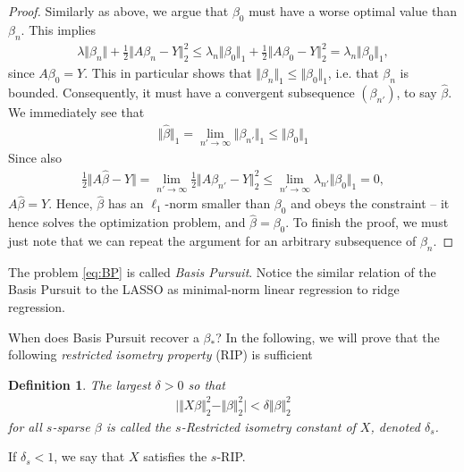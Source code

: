 \documentclass{article}
\newtheorem{defi}{Definition}
\newcommand{\abs}[1]{\vert #1 \vert}
\newcommand{\norm}[1]{\Vert #1 \Vert}
\begin{document}
\begin{proof}
    Similarly as above, we argue that $\beta_0$ must have a worse optimal value than $\beta_n$. This implies
    \begin{align*}
        \lambda \norm{\beta_n} + \tfrac{1}{2}\norm{A\beta_n- Y}_2^2 \leq \lambda_n \norm{\beta_0}_1 +\tfrac{1}{2}\norm{A\beta_0- Y}_2^2 = \lambda_n\norm{\beta_0}_1,
    \end{align*}
    since $A\beta_0 = Y$. This in particular shows that $\norm{\beta_n}_1 \leq \norm{\beta_0}_1$, i.e. that $\beta_n$ is bounded. Consequently, it must have a convergent subsequence $(\beta_{n'})$, to say $\hat{\beta}$. We immediately see that 
    \begin{align*}
        \norm{\hat{\beta}}_1 = \lim_{n'\to \infty }\norm{\beta_{n'}}_1 \leq \norm{\beta_0}_1
    \end{align*}
    Since also
    \begin{align*}
        \tfrac{1}{2}\norm{A\hat{\beta}-Y} = \lim_{n'\to \infty} \tfrac{1}{2}\norm{A\beta_{n'}- Y}_2^2 \leq \lim_{n'\to\infty}\lambda_{n'} \norm{\beta_0}_1 = 0,
    \end{align*}
    $A\hat{\beta}=Y$. Hence, $\hat{\beta}$ has an $\ell_1$-norm smaller than $\beta_0$ and obeys the constraint -- it hence solves the optimization problem, and $\hat{\beta}=\beta_0$. To finish the proof, we must just note that we can repeat the argument for an arbitrary subsequence of $\beta_n$.
   
\end{proof}

The problem \ref{eq:BP} is called \emph{Basis Pursuit}. Notice the similar relation of the Basis Pursuit to the LASSO as minimal-norm linear regression to ridge regression.

When does Basis Pursuit recover a $\beta_*$? In the following, we will prove that the following \emph{restricted isometry property} (RIP) is sufficient
\begin{defi}
    The largest $\delta>0$ so that
    \begin{align*}
        \abs{\norm{X\beta}_2^2 - \norm{\beta}_2^2}< \delta\norm{\beta}_2^2
    \end{align*}
    for all $s$-sparse $\beta$ is called the $s$-Restricted isometry constant of $X$, denoted $\delta_s$. 
\end{defi}
If $\delta_s<1$, we say that $X$ satisfies the $s$-RIP.
\end{document}
